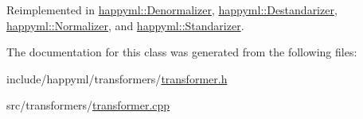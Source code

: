 Reimplemented in \hyperlink{classhappyml_1_1Denormalizer_a2f1aa35006d0573f07fc33e8f154c170}{happyml\+::\+Denormalizer}, \hyperlink{classhappyml_1_1Destandarizer_a2d1542f1857bfe0cb23fa69b139d2368}{happyml\+::\+Destandarizer}, \hyperlink{classhappyml_1_1Normalizer_aeff0b4e117d69311cc5845c9915fa691}{happyml\+::\+Normalizer}, and \hyperlink{classhappyml_1_1Standarizer_a5c9b416b657cb61972c27b27fd379b2d}{happyml\+::\+Standarizer}.



The documentation for this class was generated from the following files\+:\begin{DoxyCompactItemize}
\item 
include/happyml/transformers/\hyperlink{transformer_8h}{transformer.\+h}\item 
src/transformers/\hyperlink{transformer_8cpp}{transformer.\+cpp}\end{DoxyCompactItemize}
